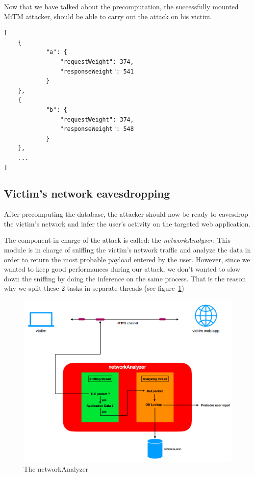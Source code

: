 \documentclass[runningheads]{llncs}
\begin{document}
Now that we have talked about the precomputation, the successfully mounted MiTM attacker, should be able to carry out the attack on his victim.

\begin{lstlisting}[caption=The JSON structure of the precomputed database, label={listing:databaseStructure}]
[
	{
			"a": {
				"requestWeight": 374,
				"responseWeight": 541
			}
	},
	{
			"b": {
				"requestWeight": 374,
				"responseWeight": 548
			}
	},
    ...
]
\end{lstlisting}

\subsection{Victim's network eavesdropping}

After precomputing the database, the attacker should now be ready to eavesdrop the victim's network and infer the user's activity on the targeted web application.

\medskip

The component in charge of the attack is called: the \emph{networkAnalyzer}. This module is in charge of sniffing the victim's network traffic and analyze the data in order to return the most probable payload entered by the user. However, since we wanted to keep good performances during our attack, we don't wanted to slow down the sniffing by doing the inference on the same process. That is the reason why we split these 2 tasks in separate threads (see figure~\ref{fig:networkAnalyzer})

\begin{figure}[h]
\centering
\includegraphics[width=\textwidth]{images/networkAnalyzer.png}
\caption{The networkAnalyzer}
\label{fig:networkAnalyzer}
\end{figure}
\end{document}
